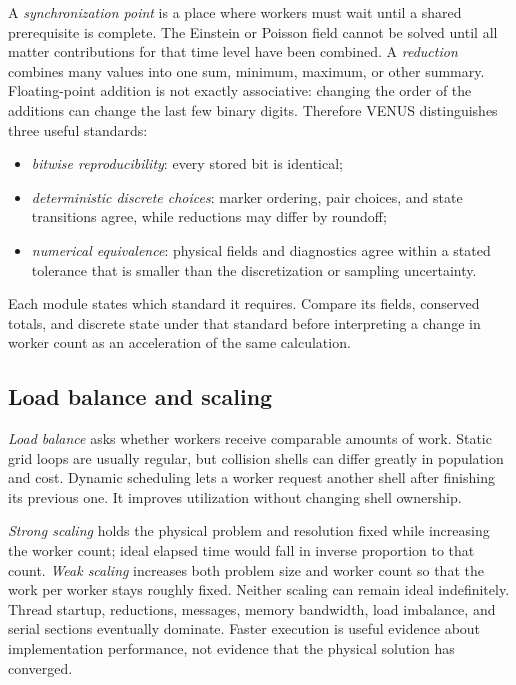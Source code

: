 A \emph{synchronization point} is a place where workers must wait until a
shared prerequisite is complete.  The Einstein or Poisson field cannot be
solved until all matter contributions for that time level have been combined.
A \emph{reduction} combines many values into one sum, minimum, maximum, or
other summary.  Floating-point addition is not exactly associative: changing
the order of the additions can change the last few binary digits.  Therefore
VENUS distinguishes three useful standards:

\begin{itemize}
\item \emph{bitwise reproducibility}: every stored bit is identical;
\item \emph{deterministic discrete choices}: marker ordering, pair choices,
      and state transitions agree, while reductions may differ by roundoff;
\item \emph{numerical equivalence}: physical fields and diagnostics agree
      within a stated tolerance that is smaller than the discretization or
      sampling uncertainty.
\end{itemize}

Each module states which standard it requires. Compare its fields, conserved
totals, and discrete state under that standard before interpreting a change
in worker count as an acceleration of the same calculation.

\subsection{Load balance and scaling}

\emph{Load balance} asks whether workers receive comparable amounts of work.
Static grid loops are usually regular, but collision shells can differ greatly
in population and cost.  Dynamic scheduling lets a worker request another
shell after finishing its previous one.  It improves utilization without
changing shell ownership.

\emph{Strong scaling} holds the physical problem and resolution fixed while
increasing the worker count; ideal elapsed time would fall in inverse
proportion to that count.  \emph{Weak scaling} increases both problem size and
worker count so that the work per worker stays roughly fixed.  Neither scaling
can remain ideal indefinitely.  Thread startup, reductions, messages, memory
bandwidth, load imbalance, and serial sections eventually dominate.  Faster
execution is useful evidence about implementation performance, not evidence
that the physical solution has converged.

